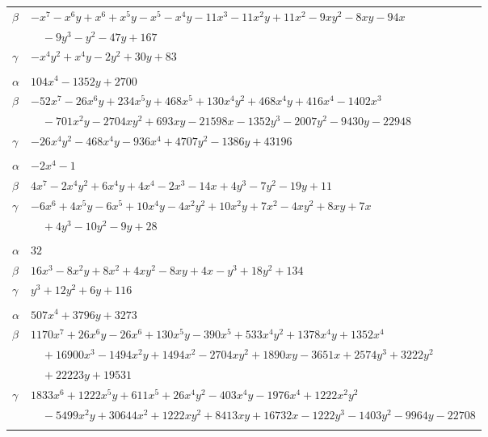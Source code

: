 \documentclass[11pt]{article}
\begin{document}
\begin{longtable}{@{}ll@{}}
$\beta$ & $-x^{7}-x^{6}y+x^{6}+x^{5}y-x^{5}-x^{4}y-11x^{3}-11x^{2}y+11x^{2}-9xy^{2}-8xy-94x$\\
 & $\quad -9y^{3}-y^{2}-47y+167$\\
$\gamma$ & $-x^{4}y^{2}+x^{4}y-2y^{2}+30y+83$\\
\addlinespace[3pt]
\multicolumn{2}{@{}l}{$\{i,j\}=\{8,14\}$, $k_{ij}=2^{2}\cdot 3^{3}\cdot 5^{2}$}\\
$\alpha$ & $104x^{4}-1352y+2700$\\
$\beta$ & $-52x^{7}-26x^{6}y+234x^{5}y+468x^{5}+130x^{4}y^{2}+468x^{4}y+416x^{4}-1402x^{3}$\\
 & $\quad -701x^{2}y-2704xy^{2}+693xy-21598x-1352y^{3}-2007y^{2}-9430y-22948$\\
$\gamma$ & $-26x^{4}y^{2}-468x^{4}y-936x^{4}+4707y^{2}-1386y+43196$\\
\addlinespace[3pt]
\multicolumn{2}{@{}l}{$\{i,j\}=\{8,16\}$, $k_{ij}=3^{3}$}\\
$\alpha$ & $-2x^{4}-1$\\
$\beta$ & $4x^{7}-2x^{4}y^{2}+6x^{4}y+4x^{4}-2x^{3}-14x+4y^{3}-7y^{2}-19y+11$\\
$\gamma$ & $-6x^{6}+4x^{5}y-6x^{5}+10x^{4}y-4x^{2}y^{2}+10x^{2}y+7x^{2}-4xy^{2}+8xy+7x$\\
 & $\quad +4y^{3}-10y^{2}-9y+28$\\
\addlinespace[3pt]
\multicolumn{2}{@{}l}{$\{i,j\}=\{9,11\}$, $k_{ij}=2\cdot 5^{2}$}\\
$\alpha$ & $32$\\
$\beta$ & $16x^{3}-8x^{2}y+8x^{2}+4xy^{2}-8xy+4x-y^{3}+18y^{2}+134$\\
$\gamma$ & $y^{3}+12y^{2}+6y+116$\\
\addlinespace[3pt]
\multicolumn{2}{@{}l}{$\{i,j\}=\{9,16\}$, $k_{ij}=2^{5}\cdot 3$}\\
$\alpha$ & $507x^{4}+3796y+3273$\\
$\beta$ & $1170x^{7}+26x^{6}y-26x^{6}+130x^{5}y-390x^{5}+533x^{4}y^{2}+1378x^{4}y+1352x^{4}$\\
 & $\quad +16900x^{3}-1494x^{2}y+1494x^{2}-2704xy^{2}+1890xy-3651x+2574y^{3}+3222y^{2}$\\
 & $\quad +22223y+19531$\\
$\gamma$ & $1833x^{6}+1222x^{5}y+611x^{5}+26x^{4}y^{2}-403x^{4}y-1976x^{4}+1222x^{2}y^{2}$\\
 & $\quad -5499x^{2}y+30644x^{2}+1222xy^{2}+8413xy+16732x-1222y^{3}-1403y^{2}-9964y-22708$\\
\addlinespace[3pt]
\multicolumn{2}{@{}l}{$\{i,j\}=\{9,43\}$, $k_{ij}=2^{5}\cdot 3^{3}\cdot 5\cdot 13$}\\

\end{longtable}
\end{document}

